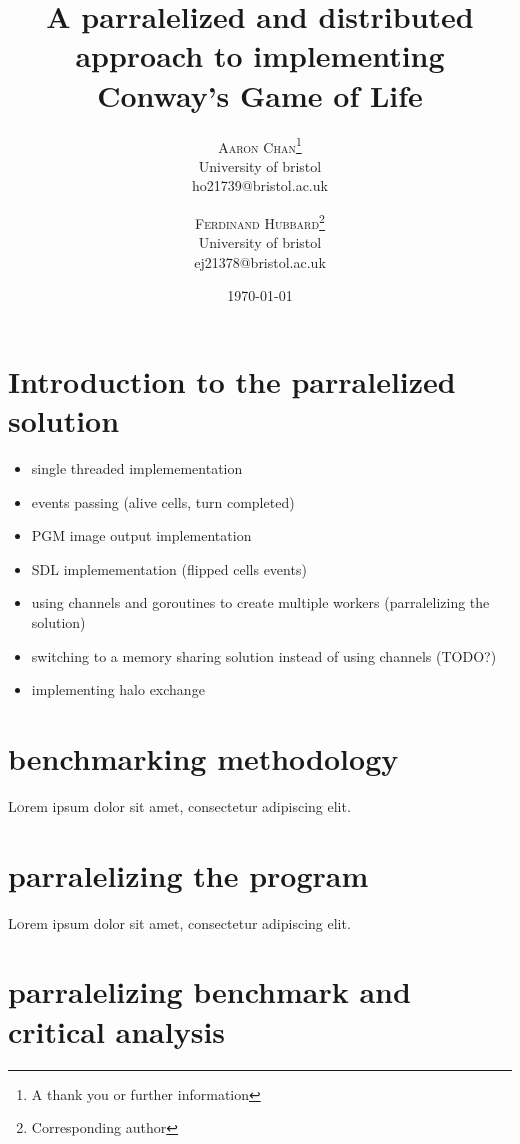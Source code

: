 \documentclass[twoside,twocolumn]{article}
\title{A parralelized and distributed approach to implementing Conway's Game of Life} %
\author{%
\textsc{Aaron Chan}\thanks{A thank you or further information} \\[1ex] %
\normalsize University of bristol \\ %
\normalsize {ho21739@bristol.ac.uk} %
\and %
\textsc{Ferdinand Hubbard}\thanks{Corresponding author} \\[1ex] %
\normalsize University of bristol \\ %
\normalsize {ej21378@bristol.ac.uk} %
}
\date{\today} %
\begin{document}
\maketitle

\section{Introduction to the parralelized solution}

\begin{itemize}
  \item single threaded implemementation
  \item events passing (alive cells, turn completed)
  \item PGM image output implementation
  \item SDL implemementation (flipped cells events)
  \item using channels and goroutines to create multiple workers (parralelizing the solution)
  \item switching to a memory sharing solution instead of using channels (TODO?)
  \item implementing halo exchange
\end{itemize}

\section{benchmarking methodology}

\lettrine[nindent=0em,lines=3]{L} orem ipsum dolor sit amet, consectetur adipiscing elit.
\blindtext %

\section{parralelizing the program}

\lettrine[nindent=0em,lines=3]{L} orem ipsum dolor sit amet, consectetur adipiscing elit.
\blindtext %


\section{parralelizing benchmark and critical analysis}
\end{document}

